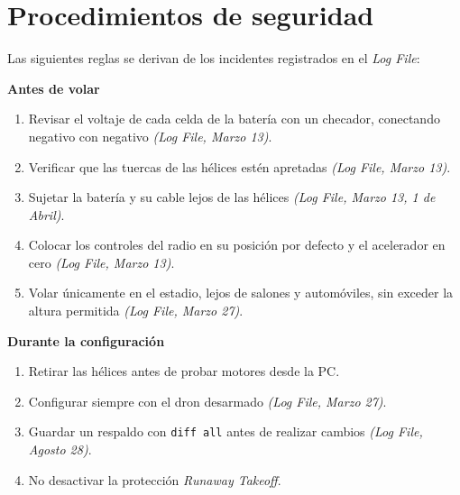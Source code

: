 \documentclass[11pt,letterpaper]{article}
\newcommand{\logref}[1]{\textit{(Log File, #1)}}
\begin{document}
\section{Procedimientos de seguridad}
Las siguientes reglas se derivan de los incidentes registrados en el \textit{Log File}:

\noindent\textbf{Antes de volar}
\begin{enumerate}[nosep]
    \item Revisar el voltaje de cada celda de la batería con un checador, conectando negativo con negativo \logref{Marzo 13}.
    \item Verificar que las tuercas de las hélices estén apretadas \logref{Marzo 13}.
    \item Sujetar la batería y su cable lejos de las hélices \logref{Marzo 13, 1 de Abril}.
    \item Colocar los controles del radio en su posición por defecto y el acelerador en cero \logref{Marzo 13}.
    \item Volar únicamente en el estadio, lejos de salones y automóviles, sin exceder la altura permitida \logref{Marzo 27}.
\end{enumerate}

\noindent\textbf{Durante la configuración}
\begin{enumerate}[nosep]
    \item Retirar las hélices antes de probar motores desde la PC.
    \item Configurar siempre con el dron desarmado \logref{Marzo 27}.
    \item Guardar un respaldo con \texttt{diff all} antes de realizar cambios \logref{Agosto 28}.
    \item No desactivar la protección \textit{Runaway Takeoff}.
\end{enumerate}

\end{document}
